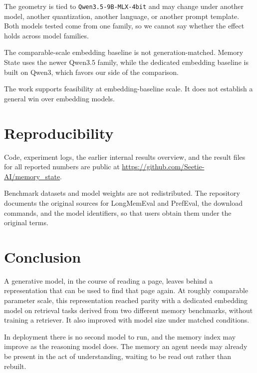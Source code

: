\documentclass[
  10pt,
  letterpaper,
]{article}
\begin{document}
The geometry is tied to \texttt{Qwen3.5-9B-MLX-4bit} and may change
under another model, another quantization, another language, or another
prompt template. Both models tested come from one family, so we cannot
say whether the effect holds across model families.

The comparable-scale embedding baseline is not generation-matched.
Memory State uses the newer Qwen3.5 family, while the dedicated
embedding baseline is built on Qwen3, which favors our side of the
comparison.

The work supports feasibility at embedding-baseline scale. It does not
establish a general win over embedding models.

\section{Reproducibility}\label{reproducibility}

Code, experiment logs, the earlier internal results overview, and the
result files for all reported numbers are public at
\url{https://github.com/Seetie-AI/memory_state}.

Benchmark datasets and model weights are not redistributed. The
repository documents the original sources for LongMemEval and PrefEval,
the download commands, and the model identifiers, so that users obtain
them under the original terms.

\section{Conclusion}\label{conclusion}

A generative model, in the course of reading a page, leaves behind a
representation that can be used to find that page again. At roughly
comparable parameter scale, this representation reached parity with a
dedicated embedding model on retrieval tasks derived from two different
memory benchmarks, without training a retriever. It also improved with
model size under matched conditions.

In deployment there is no second model to run, and the memory index may
improve as the reasoning model does. The memory an agent needs may
already be present in the act of understanding, waiting to be read out
rather than rebuilt.
\end{document}
